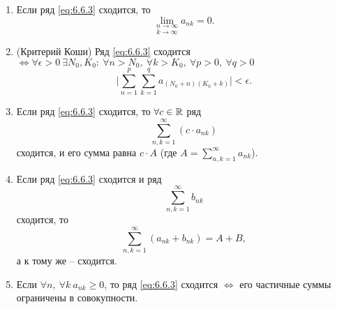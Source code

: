 \begin{theorem}\leavevmode
    \begin{enumerate}
        \item Если ряд \ref{eq:6.6.3} сходится, то
              \[
                  \underset{k\rightarrow\infty}{\underset{n\rightarrow\infty}{\lim}}a_{nk} = 0.
              \]

        \item (Критерий Коши)
              Ряд \ref{eq:6.6.3} сходится $\iff \forall \epsilon > 0 \ \exists N_0,K_0: \ \forall n > N_0, \ \forall k > K_0, \ \forall p > 0, \ \forall q > 0$
              \[
                  \bigg|\sum_{n=1}^{p}\sum_{k=1}^{q}a_{(N_0 + n)(K_0 + k)}\bigg| < \epsilon.
              \]

        \item Если ряд \ref{eq:6.6.3} сходится, то $\forall c \in \mathbb{R}$ ряд
              \[
                  \sum_{n,k=1}^{\infty}(c\cdot a_{nk})
              \]
              сходится, и его сумма равна $c\cdot A$ (где $A = \sum_{n,k=1}^{\infty}a_{nk}$).

        \item Если ряд \ref{eq:6.6.3} сходится и ряд
              \[
                  \sum_{n,k=1}^{\infty}b_{nk}
              \]
              сходится, то
              \[
                  \sum_{n,k=1}^{\infty}(a_{nk} + b_{nk}) = A + B,
              \]
              а к тому же -- сходится.

        \item Если $\forall n, \ \forall k \ a_{nk} \geqslant 0$, то ряд \ref{eq:6.6.3} сходится $ \iff $ его частичные суммы ограничены в совокупности.
    \end{enumerate}
\end{theorem}

